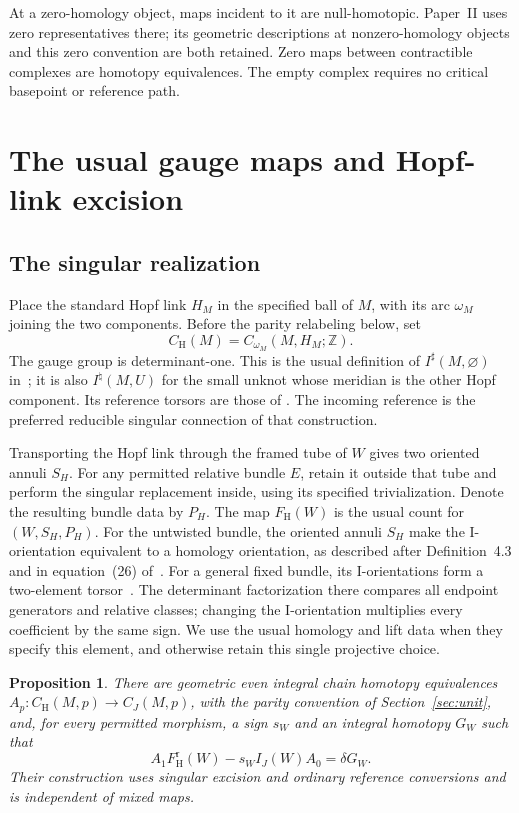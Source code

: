 \documentclass[11pt]{amsart}
\newtheorem{proposition}[theorem]{Proposition}
\theoremstyle{definition}
\theoremstyle{remark}
\theoremstyle{plain}
\newcommand{\ZZ}{\mathbb Z}
\newcommand{\CH}{C_{\mathrm H}}
\newcommand{\CJ}{C_J}
\newcommand{\FH}{F_{\mathrm H}}
\newcommand{\IGJ}{I_J}
\begin{document}
At a zero-homology object, maps incident to it are null-homotopic.
Paper~II uses zero representatives there; its geometric descriptions
at nonzero-homology objects and this zero convention are both retained.
Zero maps between contractible complexes are homotopy equivalences.
The empty complex requires no critical basepoint or reference path.

\section{The usual gauge maps and Hopf-link excision}\label{sec:excision}

\subsection{The singular realization}
Place the standard Hopf link $H_M$ in the specified ball of $M$,
with its arc $\omega_M$ joining the two components. Before the
parity relabeling below, set
\[
 \CH(M)=C_{\omega_M}(M,H_M;\ZZ).
\]
The gauge group is determinant-one. This is the usual definition
of $I^\sharp(M,\varnothing)$ in~\cite[Section~4.3]{KM}; it is also
$I^\natural(M,U)$ for the small unknot whose meridian is the other
Hopf component. Its reference torsors are those of
\cite[Section~4.4]{KM}. The incoming reference is the preferred
reducible singular connection of that construction.

Transporting the Hopf link through the framed tube of $W$ gives
two oriented annuli $S_H$. For any permitted relative bundle $E$,
retain it outside that tube and perform the singular replacement
inside, using its specified trivialization. Denote the resulting
bundle data by $P_H$. The map $\FH(W)$ is the usual count for
$(W,S_H,P_H)$. For the untwisted bundle, the oriented annuli $S_H$
make the I-orientation equivalent to a homology orientation, as
described after Definition~4.3 and in equation~(26)
of~\cite{KM}. For a general fixed bundle, its I-orientations form
a two-element torsor~\cite[Definition~3.9]{KM}. The determinant
factorization there compares all endpoint generators and relative
classes; changing the I-orientation multiplies every coefficient by
the same sign. We use the usual homology and lift data when they
specify this element, and otherwise retain this single projective
choice.

\begin{proposition}\label{prop:gauge}
There are geometric even integral chain homotopy equivalences
$A_p:\CH(M,p)\to\CJ(M,p)$, with the parity convention of
Section~\ref{sec:unit}, and, for every permitted morphism, a sign
$s_W$ and an integral homotopy $G_W$ such that
\begin{equation}\label{eq:gauge-square}
 A_1\FH^{\mathrm r}(W)-s_W\IGJ(W)A_0=\delta G_W.
\end{equation}
Their construction uses singular excision and ordinary reference
conversions and is independent of mixed maps.
\end{proposition}
\end{document}
